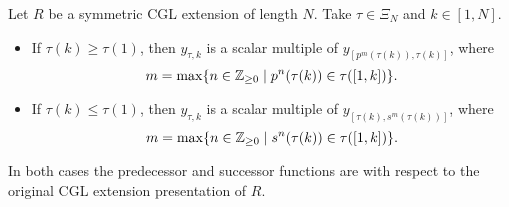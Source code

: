 \begin{lemma}
	Let $R$ be a symmetric CGL extension of length $N$. Take $\tau \in \Xi_N$ and $k \in [1, N]$.
	\begin{itemize}
		\item If $\tau(k) \geq \tau(1)$, then $y_{\tau,k}$ is a scalar multiple of $y_{[p^m(\tau(k)),
							      \tau(k)]}$, where
		      \begin{equation*}
			      m = \max\{n \in \mathbb{Z}_{\geq 0} \mid p^n(\tau(k)) \in \tau([1,k])\}.
		      \end{equation*}
		\item If $\tau(k) \leq \tau(1)$, then $y_{\tau,k}$ is a scalar multiple of $y_{[\tau(k),s^m(
							      \tau(k))]}$, where
		      \begin{equation*}
			      m = \max\{n \in \mathbb{Z}_{\geq 0} \mid s^n(\tau(k)) \in \tau([1,k])\}.
		      \end{equation*}
	\end{itemize}
	In both cases the predecessor and successor functions are with respect to the original
	CGL extension presentation of $R$.
\end{lemma}
